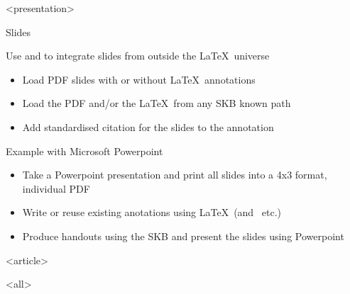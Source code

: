 \mode
<presentation>

\begin{frame}{Slides}
  \label{manual:slides1}

  Use \cmd{\skbslide} and \cmd{\skbslidecite} to integrate slides from outside the \LaTeX~universe
  \begin{itemize}
    \item Load PDF slides with or without \LaTeX~annotations
    \item Load the PDF and/or the \LaTeX~from any SKB known path
    \item Add standardised citation for the slides to the annotation
  \end{itemize}

  Example with Microsoft Powerpoint
  \begin{itemize}
    \item Take a Powerpoint presentation and print all slides into a 4x3 format, individual PDF
    \item Write or reuse existing anotations using \LaTeX~(and \BibTeX~etc.)
    \item Produce handouts using the SKB and present the slides using Powerpoint
  \end{itemize}

\end{frame}


\mode
<article>

\bigskip


\clearpage

\mode
<all>
